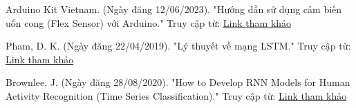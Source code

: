 \begin{thebibliography}{3}
    \item Arduino Kit Vietnam. (Ngày đăng 12/06/2023). "Hướng dẫn sử dụng cảm biến uốn cong (Flex Sensor) với Arduino." Truy cập từ: \href{https://arduinokit.vn/huong-dan-su-dung-cam-bien-uon-cong-flex-sensor-voi-arduino/}{Link tham khảo} 
    \item Pham, D. K. (Ngày đăng 22/04/2019). "Lý thuyết về mạng LSTM." Truy cập từ: \href{https://phamdinhkhanh.github.io/2019/04/22/Ly_thuyet_ve_mang_LSTM.html?fbclid=IwAR0rBn2SL1vPNYmLgixLra-BoMMb6f98mhPrMxv_BhX13_9sK3_4da1vN6c}{Link tham khảo}
    \item Brownlee, J. (Ngày đăng 28/08/2020). "How to Develop RNN Models for Human Activity Recognition (Time Series Classification)." Truy cập từ: \href{https://machinelearningmastery.com/how-to-develop-rnn-models-for-human-activity-recognition-time-series-classification/}{Link tham khảo}  
    
\end{thebibliography}